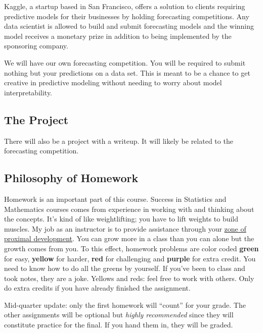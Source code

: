 \documentclass[12pt]{article}
\newcommand{\ingreen}[1]{\color{green}\textbf{#1} \color{black}}
\newcommand{\inyellow}[1]{\color{yellow}\textbf{#1} \color{black}}
\newcommand{\inred}[1]{\color{red}\textbf{#1} \color{black}}
\newcommand{\inpurple}[1]{\color{purple}\textbf{#1} \color{black}}
\newcommand{\qu}[1]{``#1''}
\begin{document}
Kaggle, a startup based in San Francisco, offers a solution to clients requiring predictive models for their businesses by holding forecasting competitions. Any data scientist is allowed to build and submit forecasting models and the winning model receives a monetary prize in addition to being implemented by the sponsoring company.  

We will have our own forecasting competition. You will be required to submit nothing but your predictions on a data set. This is meant to be a chance to get creative in predictive modeling without needing to worry about model interpretability. 


\subsection*{The Project}

There will also be a project with a writeup. It will likely be related to the forecasting competition.

\subsection*{Philosophy of Homework}

Homework is an important part of this course. Success in Statistics and Mathematics courses comes from experience in working with and thinking about the concepts. It's kind of like weightlifting; you have to lift weights to build muscles. My job as an instructor is to provide assistance through your \href{http://en.wikipedia.org/wiki/Zone_of_proximal_development}{zone of proximal development}. You can grow more in a class than you can alone but the growth comes from you. To this effect, homework problems are color coded \ingreen{green} for easy, \inyellow{yellow} for harder, \inred{red} for challenging and \inpurple{purple} for extra credit. You need to know how to do all the greens by yourself. If you've been to class and took notes, they are a joke. Yellows and reds: feel free to work with others. Only do extra credits if you have already finished the assignment.

Mid-quarter update: only the first homework will \qu{count} for your grade. The other assignments will be optional but \emph{highly recommended} since they will constitute practice for the final. If you hand them in, they will be graded.

%
\end{document}
